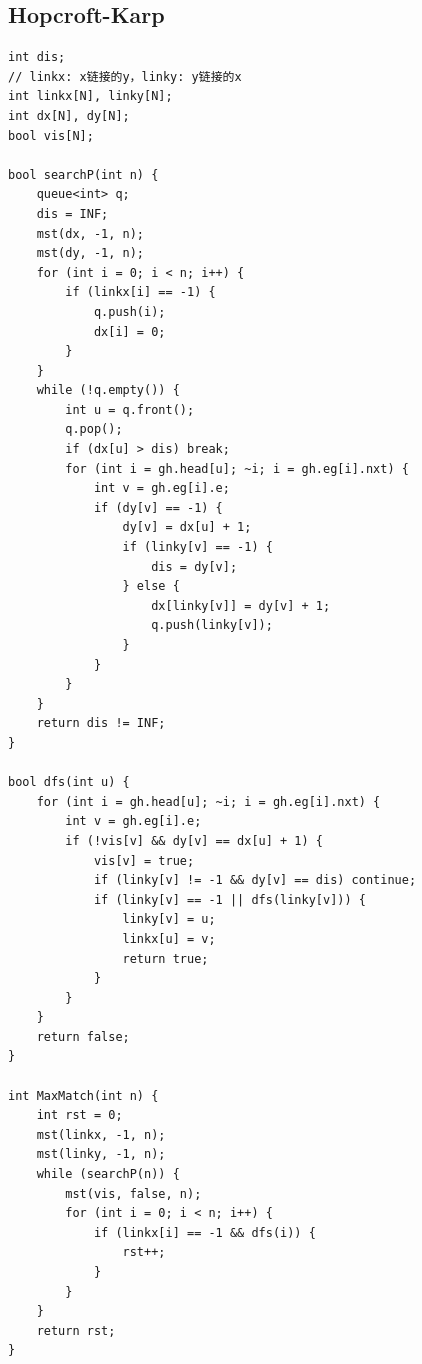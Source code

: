 \documentclass[twoside]{article}
\begin{document}
\subsection{Hopcroft-Karp}
\begin{lstlisting}
int dis;
// linkx: x链接的y，linky: y链接的x
int linkx[N], linky[N];
int dx[N], dy[N];
bool vis[N];

bool searchP(int n) {
    queue<int> q;
    dis = INF;
    mst(dx, -1, n);
    mst(dy, -1, n);
    for (int i = 0; i < n; i++) {
        if (linkx[i] == -1) {
            q.push(i);
            dx[i] = 0;
        }
    }
    while (!q.empty()) {
        int u = q.front();
        q.pop();
        if (dx[u] > dis) break;
        for (int i = gh.head[u]; ~i; i = gh.eg[i].nxt) {
            int v = gh.eg[i].e;
            if (dy[v] == -1) {
                dy[v] = dx[u] + 1;
                if (linky[v] == -1) {
                    dis = dy[v];
                } else {
                    dx[linky[v]] = dy[v] + 1;
                    q.push(linky[v]);
                }
            }
        }
    }
    return dis != INF;
}

bool dfs(int u) {
    for (int i = gh.head[u]; ~i; i = gh.eg[i].nxt) {
        int v = gh.eg[i].e;
        if (!vis[v] && dy[v] == dx[u] + 1) {
            vis[v] = true;
            if (linky[v] != -1 && dy[v] == dis) continue;
            if (linky[v] == -1 || dfs(linky[v])) {
                linky[v] = u;
                linkx[u] = v;
                return true;
            }
        }
    }
    return false;
}

int MaxMatch(int n) {
    int rst = 0;
    mst(linkx, -1, n);
    mst(linky, -1, n);
    while (searchP(n)) {
        mst(vis, false, n);
        for (int i = 0; i < n; i++) {
            if (linkx[i] == -1 && dfs(i)) {
                rst++;
            }
        }
    }
    return rst;
}\end{lstlisting}
\end{document}
